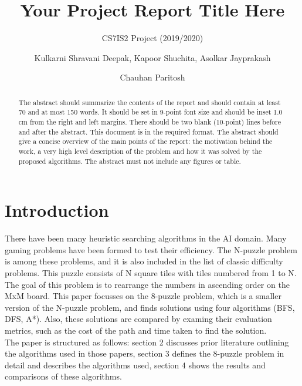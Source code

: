 \documentclass{svproc}
\begin{document}
\mainmatter
\title{Your Project Report Title Here
}
\subtitle{CS7IS2 Project (2019/2020)}
\author{Kulkarni Shravani Deepak, Kapoor Shuchita, Asolkar Jayprakash \and Chauhan Paritosh}


\maketitle              %

\begin{abstract}
The abstract should summarize the contents of the report and should contain at least 70 and at most 150 words. It should be set in 9-point font size and should be inset 1.0 cm from the right and left margins. There should be two blank (10-point) lines before and after the abstract. This document is in the required format. The abstract should give a concise overview of the main points of the report: the motivation behind the work, a very high level description of the problem and how it was solved by the proposed algorithms. The abstract must not include any figures or table.
\end{abstract}
%

 

\section{Introduction}
There have been many heuristic searching algorithms in the AI domain. Many gaming problems have been formed to test their efficiency. The N-puzzle problem is among these problems, and it is also included in the list of classic difficulty problems. This puzzle consists of N square tiles with tiles numbered from 1 to N. The goal of this problem is to rearrange the numbers in ascending order on the MxM board. This paper focusses on the 8-puzzle problem, which is a smaller version of the N-puzzle problem, and finds solutions using four algorithms (BFS, DFS, A*).  Also, these solutions are compared by examing their evaluation metrics, such as the cost of the path and time taken to find the solution. \\

\noindent The paper is structured as follows: section 2 discusses prior literature outlining the algorithms used in those papers,  section 3 defines the 8-puzzle problem in detail and describes the algorithms used, section 4 shows the results and comparisons of these algorithms.
\end{document}
